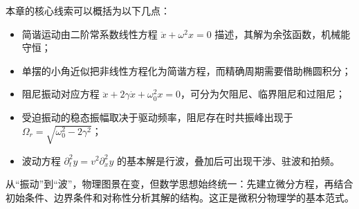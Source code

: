 本章的核心线索可以概括为以下几点：
\begin{itemize}
  \item 简谐运动由二阶常系数线性方程 $\ddot x+\omega^2x=0$ 描述，其解为余弦函数，机械能守恒；
  \item 单摆的小角近似把非线性方程化为简谐方程，而精确周期需要借助椭圆积分；
  \item 阻尼振动对应方程 $\ddot x+2\gamma\dot x+\omega_0^2x=0$，可分为欠阻尼、临界阻尼和过阻尼；
  \item 受迫振动的稳态振幅取决于驱动频率，阻尼存在时共振峰出现于 $\Omega_r=\sqrt{\omega_0^2-2\gamma^2}$；
  \item 波动方程 $\partial_t^2 y=v^2\partial_x^2 y$ 的基本解是行波，叠加后可出现干涉、驻波和拍频。
\end{itemize}

从“振动”到“波”，物理图景在变，但数学思想始终统一：先建立微分方程，再结合初始条件、边界条件和对称性分析其解的结构。这正是微积分物理学的基本范式。
